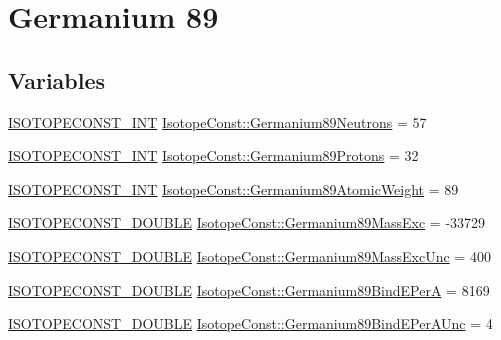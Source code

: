 \hypertarget{group___isotope_const-_germanium-_ge89}{}\section{Germanium 89}
\label{group___isotope_const-_germanium-_ge89}
\subsection*{Variables}
\begin{DoxyCompactItemize}
\item 
\mbox{\hyperlink{group___isotope_const-_macros_ga5f18360b3e99483a35c32d789e62621c}{I\+S\+O\+T\+O\+P\+E\+C\+O\+N\+S\+T\+\_\+\+I\+NT}} \mbox{\hyperlink{group___isotope_const-_germanium-_ge89_ga6ba2b734b7b7485fa6df3a0e257d796f}{Isotope\+Const\+::\+Germanium89\+Neutrons}} = 57
\item 
\mbox{\hyperlink{group___isotope_const-_macros_ga5f18360b3e99483a35c32d789e62621c}{I\+S\+O\+T\+O\+P\+E\+C\+O\+N\+S\+T\+\_\+\+I\+NT}} \mbox{\hyperlink{group___isotope_const-_germanium-_ge89_ga507020e6e80c7fea2ec17a4d6db7d0b8}{Isotope\+Const\+::\+Germanium89\+Protons}} = 32
\item 
\mbox{\hyperlink{group___isotope_const-_macros_ga5f18360b3e99483a35c32d789e62621c}{I\+S\+O\+T\+O\+P\+E\+C\+O\+N\+S\+T\+\_\+\+I\+NT}} \mbox{\hyperlink{group___isotope_const-_germanium-_ge89_ga70008c1452e57db84423e4898e3a6b38}{Isotope\+Const\+::\+Germanium89\+Atomic\+Weight}} = 89
\item 
\mbox{\hyperlink{group___isotope_const-_macros_ga8f45a7272ce02c0b4c65c44636ed719a}{I\+S\+O\+T\+O\+P\+E\+C\+O\+N\+S\+T\+\_\+\+D\+O\+U\+B\+LE}} \mbox{\hyperlink{group___isotope_const-_germanium-_ge89_ga939aa94143fea5beb65e49d3961ebfc9}{Isotope\+Const\+::\+Germanium89\+Mass\+Exc}} = -\/33729
\item 
\mbox{\hyperlink{group___isotope_const-_macros_ga8f45a7272ce02c0b4c65c44636ed719a}{I\+S\+O\+T\+O\+P\+E\+C\+O\+N\+S\+T\+\_\+\+D\+O\+U\+B\+LE}} \mbox{\hyperlink{group___isotope_const-_germanium-_ge89_ga47031ee8f95a2059ab97bf9b662bd58e}{Isotope\+Const\+::\+Germanium89\+Mass\+Exc\+Unc}} = 400
\item 
\mbox{\hyperlink{group___isotope_const-_macros_ga8f45a7272ce02c0b4c65c44636ed719a}{I\+S\+O\+T\+O\+P\+E\+C\+O\+N\+S\+T\+\_\+\+D\+O\+U\+B\+LE}} \mbox{\hyperlink{group___isotope_const-_germanium-_ge89_ga29fd93bc123db817b81eac81ed2b48fd}{Isotope\+Const\+::\+Germanium89\+Bind\+E\+PerA}} = 8169
\item 
\mbox{\hyperlink{group___isotope_const-_macros_ga8f45a7272ce02c0b4c65c44636ed719a}{I\+S\+O\+T\+O\+P\+E\+C\+O\+N\+S\+T\+\_\+\+D\+O\+U\+B\+LE}} \mbox{\hyperlink{group___isotope_const-_germanium-_ge89_ga22b6d52166c4f8de3d6160079cb90574}{Isotope\+Const\+::\+Germanium89\+Bind\+E\+Per\+A\+Unc}} = 4

\end{DoxyCompactItemize}
